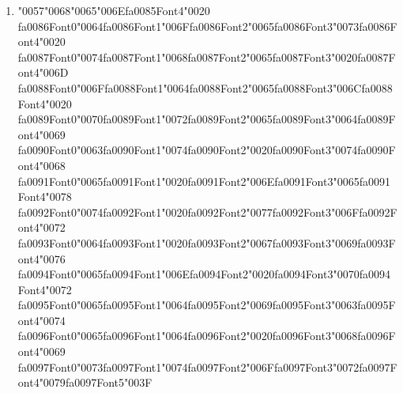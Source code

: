\documentclass[12pt]{article}
\begin{document}
\begin{enumerate}[label=Q\arabic*.]
\begin{enumerate}[label=(\Alph*)]
    \item A deeper network with more representational power
    \item A single linear model
    \item A recurrent neural network
    \item A decision tree
\end{enumerate}
\item {\char"0057}{\char"0068}{\char"0065}{\char"006E}{\csname fa0085Font4\endcsname\char"0020} {\csname fa0086Font0\endcsname\char"0064}{\csname fa0086Font1\endcsname\char"006F}{\csname fa0086Font2\endcsname\char"0065}{\csname fa0086Font3\endcsname\char"0073}{\csname fa0086Font4\endcsname\char"0020} {\csname fa0087Font0\endcsname\char"0074}{\csname fa0087Font1\endcsname\char"0068}{\csname fa0087Font2\endcsname\char"0065}{\csname fa0087Font3\endcsname\char"0020}{\csname fa0087Font4\endcsname\char"006D} {\csname fa0088Font0\endcsname\char"006F}{\csname fa0088Font1\endcsname\char"0064}{\csname fa0088Font2\endcsname\char"0065}{\csname fa0088Font3\endcsname\char"006C}{\csname fa0088Font4\endcsname\char"0020} {\csname fa0089Font0\endcsname\char"0070}{\csname fa0089Font1\endcsname\char"0072}{\csname fa0089Font2\endcsname\char"0065}{\csname fa0089Font3\endcsname\char"0064}{\csname fa0089Font4\endcsname\char"0069} {\csname fa0090Font0\endcsname\char"0063}{\csname fa0090Font1\endcsname\char"0074}{\csname fa0090Font2\endcsname\char"0020}{\csname fa0090Font3\endcsname\char"0074}{\csname fa0090Font4\endcsname\char"0068} {\csname fa0091Font0\endcsname\char"0065}{\csname fa0091Font1\endcsname\char"0020}{\csname fa0091Font2\endcsname\char"006E}{\csname fa0091Font3\endcsname\char"0065}{\csname fa0091Font4\endcsname\char"0078} {\csname fa0092Font0\endcsname\char"0074}{\csname fa0092Font1\endcsname\char"0020}{\csname fa0092Font2\endcsname\char"0077}{\csname fa0092Font3\endcsname\char"006F}{\csname fa0092Font4\endcsname\char"0072} {\csname fa0093Font0\endcsname\char"0064}{\csname fa0093Font1\endcsname\char"0020}{\csname fa0093Font2\endcsname\char"0067}{\csname fa0093Font3\endcsname\char"0069}{\csname fa0093Font4\endcsname\char"0076} {\csname fa0094Font0\endcsname\char"0065}{\csname fa0094Font1\endcsname\char"006E}{\csname fa0094Font2\endcsname\char"0020}{\csname fa0094Font3\endcsname\char"0070}{\csname fa0094Font4\endcsname\char"0072} {\csname fa0095Font0\endcsname\char"0065}{\csname fa0095Font1\endcsname\char"0064}{\csname fa0095Font2\endcsname\char"0069}{\csname fa0095Font3\endcsname\char"0063}{\csname fa0095Font4\endcsname\char"0074} {\csname fa0096Font0\endcsname\char"0065}{\csname fa0096Font1\endcsname\char"0064}{\csname fa0096Font2\endcsname\char"0020}{\csname fa0096Font3\endcsname\char"0068}{\csname fa0096Font4\endcsname\char"0069} {\csname fa0097Font0\endcsname\char"0073}{\csname fa0097Font1\endcsname\char"0074}{\csname fa0097Font2\endcsname\char"006F}{\csname fa0097Font3\endcsname\char"0072}{\csname fa0097Font4\endcsname\char"0079}{\csname fa0097Font5\endcsname\char"003F}

\end{enumerate}
\end{document}
